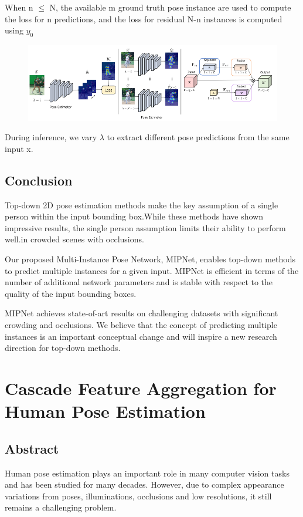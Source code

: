 \documentclass[11pt]{article}
\begin{document}
When n $\leq$ N, the available m ground truth pose instance are used to compute the loss for n predictions, and the loss for residual N-n instances is computed using $y_0$

\begin{figure}[h]
	\centering
	\includegraphics[scale = 0.5]{48}
\end{figure}

During inference, we vary $\lambda$ to extract different pose predictions from the same input x.
\subsection{Conclusion}
Top-down 2D pose estimation methods make the key assumption of a single person within the input bounding box.While these methods have shown impressive results, the single person assumption limits their ability to perform well.in crowded scenes with occlusions.

Our proposed Multi-Instance Pose Network, MIPNet, enables top-down methods to predict multiple instances for a given input. MIPNet is efficient in terms of the number of additional network parameters and is stable with respect to the quality of the input bounding boxes. 

MIPNet achieves state-of-art results on challenging datasets with significant crowding and occlusions. We believe that the concept of predicting multiple instances is an important conceptual change and will inspire a new research direction for top-down methods.
\section{Cascade Feature Aggregation for Human Pose Estimation}
\subsection{Abstract}
Human pose estimation plays an important role in many computer vision tasks and has been studied for 
many decades. However, due to complex appearance variations from poses, illuminations, occlusions and 
low resolutions, it still remains a challenging problem.
\end{document}
